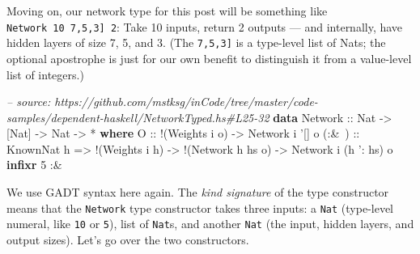 \documentclass[]{article}
\newenvironment{Shaded}{}{}
\newcommand{\KeywordTok}[1]{\textcolor[rgb]{0.00,0.44,0.13}{\textbf{#1}}}
\newcommand{\DataTypeTok}[1]{\textcolor[rgb]{0.56,0.13,0.00}{#1}}
\newcommand{\DecValTok}[1]{\textcolor[rgb]{0.25,0.63,0.44}{#1}}
\newcommand{\CharTok}[1]{\textcolor[rgb]{0.25,0.44,0.63}{#1}}
\newcommand{\CommentTok}[1]{\textcolor[rgb]{0.38,0.63,0.69}{\textit{#1}}}
\newcommand{\OtherTok}[1]{\textcolor[rgb]{0.00,0.44,0.13}{#1}}
\newcommand{\FunctionTok}[1]{\textcolor[rgb]{0.02,0.16,0.49}{#1}}
\newcommand{\NormalTok}[1]{#1}
\begin{document}
Moving on, our network type for this post will be something like
\texttt{Network\ 10\ \textquotesingle{}{[}7,5,3{]}\ 2}: Take 10 inputs, return 2
outputs --- and internally, have hidden layers of size 7, 5, and 3. (The
\texttt{\textquotesingle{}{[}7,5,3{]}} is a type-level list of Nats; the
optional \texttt{\textquotesingle{}} apostrophe is just for our own benefit to
distinguish it from a value-level list of integers.)

\begin{Shaded}
\begin{Highlighting}[]
\CommentTok{-- source: https://github.com/mstksg/inCode/tree/master/code-samples/dependent-haskell/NetworkTyped.hs#L25-32}
\KeywordTok{data} \DataTypeTok{Network}\OtherTok{ ::} \DataTypeTok{Nat} \OtherTok{->}\NormalTok{ [}\DataTypeTok{Nat}\NormalTok{] }\OtherTok{->} \DataTypeTok{Nat} \OtherTok{->} \FunctionTok{*} \KeywordTok{where}
    \DataTypeTok{O}\OtherTok{     ::} \FunctionTok{!}\NormalTok{(}\DataTypeTok{Weights}\NormalTok{ i o)}
          \OtherTok{->} \DataTypeTok{Network}\NormalTok{ i }\CharTok{'[] o}
\OtherTok{    (:&~) ::} \DataTypeTok{KnownNat}\NormalTok{ h}
          \OtherTok{=>} \FunctionTok{!}\NormalTok{(}\DataTypeTok{Weights}\NormalTok{ i h)}
          \OtherTok{->} \FunctionTok{!}\NormalTok{(}\DataTypeTok{Network}\NormalTok{ h hs o)}
          \OtherTok{->} \DataTypeTok{Network}\NormalTok{ i (h }\CharTok{': hs) o}
\KeywordTok{infixr} \DecValTok{5} \FunctionTok{:&~}
\end{Highlighting}
\end{Shaded}

We use GADT syntax here again. The \emph{kind signature} of the type constructor
means that the \texttt{Network} type constructor takes three inputs: a
\texttt{Nat} (type-level numeral, like \texttt{10} or \texttt{5}), list of
\texttt{Nat}s, and another \texttt{Nat} (the input, hidden layers, and output
sizes). Let's go over the two constructors.
\end{document}
